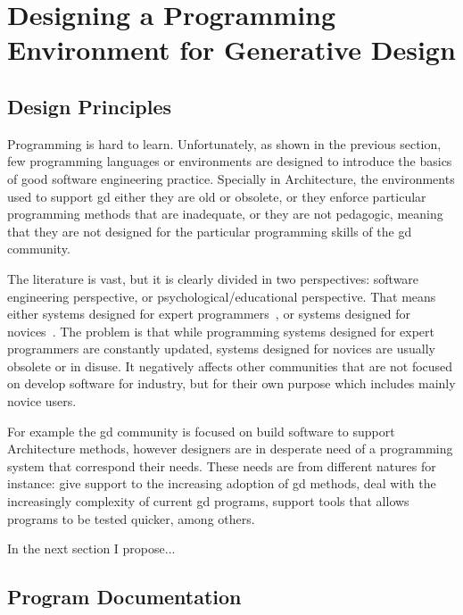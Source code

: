 \chapter{Designing a Programming Environment for Generative Design}
\label{chapter:pegd}

\section{Design Principles} 

Programming is hard to learn. Unfortunately, as shown in the previous section, few programming languages or environments are designed to introduce the basics of good software engineering practice. Specially in Architecture, the environments used to support \gls{gd} either they are old or obsolete, or they enforce particular programming methods that are inadequate, or they are not pedagogic, meaning that they are not designed for the particular programming skills of the \gls{gd} community.

The literature is vast, but it is clearly divided in two perspectives: software engineering perspective, or psychological/educational perspective. That means either systems designed for expert programmers~\citep{carlson2005eclipse,intellij2001intellij,lighttable,boudreau2002netbeans,guckenheimer2006software}, or systems designed for novices~\citep{papert1980mindstorms,goldberg1983smalltalk,GuoSIGCSE2013,Reas2006}. The problem is that while programming systems designed for expert programmers are constantly updated, systems designed for novices are usually obsolete or in disuse. It negatively affects other communities that are not focused on develop software for industry, but for their own purpose which includes mainly novice users.

For example the \gls{gd} community is focused on build software to support Architecture methods, however designers are in desperate need of a programming system that correspond their needs. These needs are from different natures for instance: give support to the increasing adoption of \gls{gd} methods, deal with the increasingly complexity of current \gls{gd} programs, support tools that allows programs to be tested quicker, among others.

In the next section I propose...

\section{Program Documentation}

